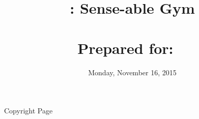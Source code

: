 \documentclass{article}
\title{
\vspace{2in}
\textmd{\textbf{\TeamName: Sense-able Gym}}\\
\textmd{\textbf\DocTitle}\\
\vspace{0.1in}\large{Prepared for: \textit{\Instructor\ }}
\vspace{3in}
}
\author{\textbf{\DocAuthorName}}
\date{Monday, November 16, 2015} %
\begin{document}
\maketitle{}
\newpage


\newpage
Copyright Page
\newpage


\newpage

\newpage



\newpage
\tableofcontents

\newpage


\newpage






















\newpage


\end{document}
